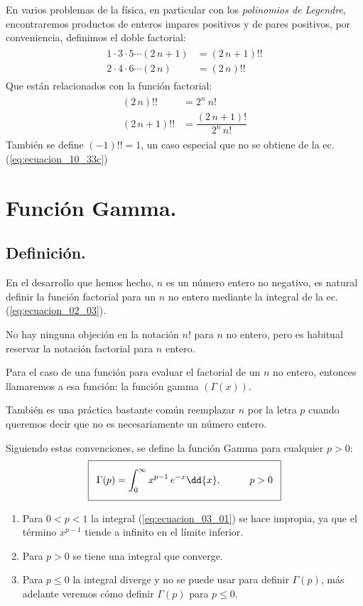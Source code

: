 En varios problemas de la física, en particular con los \emph{polinomios de Legendre}, encontraremos productos de enteros impares positivos y de pares positivos, por conveniencia, definimos el doble factorial:
\begin{align}
\begin{aligned}
1 \cdot 3 \cdot 5 \cdots (2 \, n+1) &= (2 \, n+1) !! \\
2 \cdot 4 \cdot 6 \cdots (2 \, n) &= (2 \, n) !!
\end{aligned}
\label{eq:ecuacion_10_33b}
\end{align}
Que están relacionados con la función factorial:
\begin{align}
\begin{aligned}
(2 \, n)!! &=  2^{n} \: n! \\[1em]
(2 \, n+1)!! &= \dfrac{(2 \, n+1)!}{2^{n} \, n!}
\end{aligned}
\label{eq:ecuacion_10_33c}
\end{align}
También se define $(-1)!! = 1$, un caso especial que no se obtiene de la ec. (\ref{eq:ecuacion_10_33c})

\section{Función Gamma.}

\subsection{Definición.}

En el desarrollo que hemos hecho, $n$ es un número entero no negativo, es natural definir la función factorial para un $n$ no entero mediante la integral de la ec.(\ref{eq:ecuacion_02_03}).
\par
No hay ninguna objeción en la notación $n!$ para $n$ no entero, pero es habitual reservar la notación factorial para $n$ entero.
\par
Para el caso de una función para evaluar el factorial de un $n$ no entero, entonces llamaremos a esa función: la función gamma $(\Gamma (x))$.
\par
También es una práctica bastante común reemplazar $n$ por la letra $p$ cuando queremos decir que no es necesariamente un número entero.
\par
Siguiendo estas convenciones, se define la función Gamma para cualquier $p > 0$:
\begin{align}\addtolength{\fboxsep}{5pt}\boxed{
\Gamma (p) = \int_{0}^{\infty} x^{p-1} \, e^{-x} \dd{x}, \hspace{1cm} p > 0}
\label{eq:ecuacion_03_01}
\end{align}
\begin{enumerate}
\item Para $0 < p < 1$ la integral (\ref{eq:ecuacion_03_01}) se hace impropia, ya que el término $x^{p-1}$ tiende a infinito en el límite inferior.
\item Para $p > 0$ se tiene una integral que converge.
\item Para $p \leq 0$ la integral diverge y no se puede usar para definir $\Gamma (p)$, más adelante veremos cómo definir  $\Gamma (p)$ para $p \leq 0$.
\end{enumerate}

